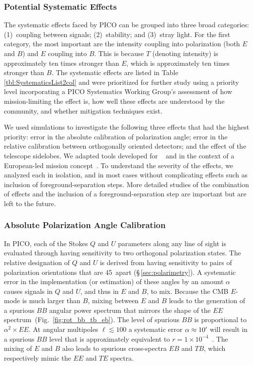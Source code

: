 \documentclass[PICOReport.tex]{subfiles}
\begin{document}
\subsubsection{Potential Systematic Effects}
\label{sec:systematics_list}


The systematic effects faced by PICO can be grouped into three broad categories: (1)~coupling between signals; (2)~stability; and (3)~stray light. For the first category, the most important are the intensity coupling into polarization (both $E$ and $B$) and $E$ coupling into $B$. This is because $T$ (denoting intensity) is approximately ten times stronger than $E$, which is approximately ten times stronger than $B$. The systematic effects are listed in Table \ref{tbl:SystematicsList2col} and were prioritized for further study using a priority level incorporating a PICO Systematics Working Group's assessment of how mission-limiting the effect is, how well these effects are understood by the community, and whether mitigation techniques exist.  

We used simulations to investigate the following three effects that had the highest priority: error in the absolute calibration of polarization angle; error in the relative calibration between orthogonally oriented detectors; and the effect of the telescope sidelobes. We adapted tools developed for \planck~\cite{plank2015_xii_focalplane} and in the context of a European-led mission concept~\citep{core_systematics}. To understand the severity of the effects, we analyzed each in isolation, and in most cases without complicating effects such as inclusion of foreground-separation steps. More detailed studies of the combination of effects and the inclusion of a foreground-separation step are important but are left to the future. 

%



\subsubsection{Absolute Polarization Angle Calibration}
\label{sec:angle}

In PICO, each of the Stokes $Q$ and $U$ parameters along any line of sight is evaluated through having sensitivity to two orthogonal polarization states. The relative designation of $Q$ and $U$ is derived from having sensitivity to pairs of polarization orientations that are 45\degree\ apart (\S\,\ref{sec:polarimetry}). A systematic error in the implementation (or estimation) of these angles by an amount $\alpha$ causes signals in $Q$ and $U$, and thus in $E$ and $B$, to mix. Because the CMB $E$-mode is much larger than $B$, mixing between $E$ and $B$ leads to the generation of a spurious $BB$ angular power spectrum that mirrors the shape of the $EE$ spectrum~(Fig.~\ref{fig:rot_bb_tb_eb}). The level of spurious $BB$ is proportional to $\alpha^{2} \times EE$. At angular multipoles $\ell \lesssim 100$ a systematic error $\alpha\approx 10'$ will result in a spurious $BB$ level that is approximately equivalent to $r = 1\times10^{-4}$~\citep{shimon2008,Aumont+2018}.  The mixing of $E$ and $B$ also leads to spurious cross-spectra $EB$ and $TB$, which respectively mimic the $EE$ and $TE$ spectra. 
\end{document}
